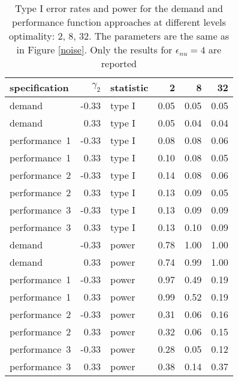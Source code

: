 \begin{table}[ht]
\centering
\begingroup\footnotesize
\begin{tabular}{lrlrrr}
  \hline
specification & $\gamma_2$ & statistic & 2 & 8 & 32 \\ 
  \hline
demand & -0.33 & type I & 0.05 & 0.05 & 0.05 \\ 
  demand & 0.33 & type I & 0.05 & 0.04 & 0.04 \\ 
  performance~1 & -0.33 & type I & 0.08 & 0.08 & 0.06 \\ 
  performance~1 & 0.33 & type I & 0.10 & 0.08 & 0.05 \\ 
  performance~2 & -0.33 & type I & 0.14 & 0.08 & 0.06 \\ 
  performance~2 & 0.33 & type I & 0.13 & 0.09 & 0.05 \\ 
  performance~3 & -0.33 & type I & 0.13 & 0.09 & 0.09 \\ 
  performance~3 & 0.33 & type I & 0.13 & 0.10 & 0.09 \\ 
  demand & -0.33 & power & 0.78 & 1.00 & 1.00 \\ 
  demand & 0.33 & power & 0.74 & 0.99 & 1.00 \\ 
  performance~1 & -0.33 & power & 0.97 & 0.49 & 0.19 \\ 
  performance~1 & 0.33 & power & 0.99 & 0.52 & 0.19 \\ 
  performance~2 & -0.33 & power & 0.31 & 0.06 & 0.16 \\ 
  performance~2 & 0.33 & power & 0.32 & 0.06 & 0.15 \\ 
  performance~3 & -0.33 & power & 0.28 & 0.05 & 0.12 \\ 
  performance~3 & 0.33 & power & 0.38 & 0.14 & 0.37 \\ 
   \hline
\end{tabular}
\endgroup
\caption{Type I error rates and power for the demand and
             performance function approaches at different levels optimality: 
             2, 8, 32. The parameters are the same as in Figure \ref{noise}.
             Only the results for $\epsilon_{nu} = 4$ are reported} 
\label{main-table}
\end{table}
